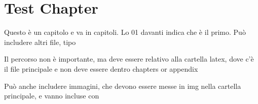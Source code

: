 \section{Test Chapter}
Questo è un capitolo e va in capitoli. Lo 01 davanti indica che è il primo. 
Può includere altri file, tipo

Il percorso non è importante, ma deve essere relativo alla cartella latex, dove c'è il file principale e non deve essere dentro chapters or appendix


Può anche includere immagini, che devono essere messe in img nella cartella principale, e vanno incluse con




